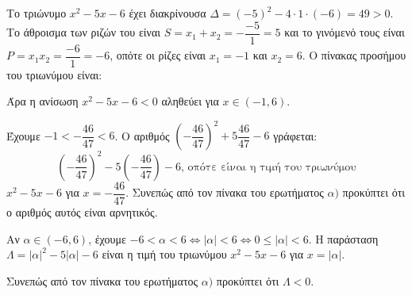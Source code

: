 
\begin{alist}
\item Το τριώνυμο $x^2 - 5x - 6$ έχει διακρίνουσα $\Delta = (-5)^2 - 4 \cdot 1 \cdot (-6) = 49 > 0$. Το άθροισμα
των ριζών του είναι $S = x_1 + x_2 = -\dfrac{-5}{1} = 5$ και το γινόμενό τους είναι $P = x_1 x_2 = \dfrac{-6}{1} = -6$,
οπότε οι ρίζες είναι $x_1 = -1$ και $x_2 = 6$. Ο πίνακας προσήμου του τριωνύμου είναι:

\begin{center}
\end{center}

Άρα η ανίσωση $x^2 - 5x - 6 < 0$ αληθεύει για $x \in (-1, 6)$.

\item Έχουμε $-1 < -\dfrac{46}{47} < 6$.
Ο αριθμός $\left(-\dfrac{46}{47}\right)^2 + 5 \dfrac{46}{47} - 6$ γράφεται:
\[\left(-\dfrac{46}{47}\right)^2 - 5 \left(-\dfrac{46}{47}\right) - 6\text{, οπότε είναι η τιμή του τριωνύμου}\]
$x^2 - 5x - 6$ για $x = -\dfrac{46}{47}$.
Συνεπώς από τον πίνακα του ερωτήματος $\alpha)$ προκύπτει ότι ο αριθμός αυτός είναι αρνητικός.

\item Αν $\alpha \in (-6, 6)$, έχουμε $-6 < \alpha < 6 \Leftrightarrow |\alpha| < 6 \Leftrightarrow 0 \le |\alpha| < 6$.
Η παράσταση $\Lambda = |\alpha|^2 - 5|\alpha| - 6$ είναι η τιμή του τριωνύμου
$x^2 - 5x - 6$ για $x = |\alpha|$.

Συνεπώς από τον πίνακα του ερωτήματος $\alpha)$ προκύπτει ότι $\Lambda < 0$.
\end{alist}

